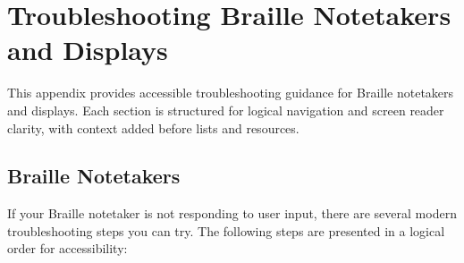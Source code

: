 \chapter{Troubleshooting Braille Notetakers and Displays}
\label{trouble2}

\begin{raggedright}
This appendix provides accessible troubleshooting guidance for Braille notetakers and displays. Each section is structured for logical navigation and screen reader clarity, with context added before lists and resources.
\end{raggedright}

\section{Braille Notetakers}
\label{notebook}
If your Braille notetaker is not responding to user input, there are several modern troubleshooting steps you can try. The following steps are presented in a logical order for accessibility:

